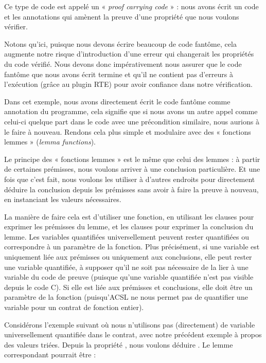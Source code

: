 



Ce type de code est appelé un « \textit{proof carrying code} » : nous avons écrit
un code et les annotations qui amènent la preuve d'une propriété que nous voulons
vérifier.


Notons qu'ici, puisque nous devons écrire beaucoup de code fantôme, cela augmente
notre risque d'introduction d'une erreur qui changerait les propriétés du code
vérifié. Nous devons donc impérativement nous assurer que le code fantôme que
nous avons écrit termine et qu'il ne contient pas d'erreurs à l'exécution
(grâce au plugin RTE) pour avoir confiance dans notre vérification.


Dans cet exemple, nous avons directement écrit le code fantôme comme annotation du
programme, cela signifie que si nous avons un autre appel comme celui-ci quelque
part dans le code avec une précondition similaire, nous aurions à le faire à
nouveau. Rendons cela plus simple et modulaire avec des « fonctions lemmes »
(\textit{lemma functions}).





Le principe des « fonctions lemmes » est le même que celui des lemmes : à
partir de certaines prémisses, nous voulons arriver à une conclusion particulière.
Et une fois que c'est fait, nous voulons les utiliser à d'autres endroits pour
directement déduire la conclusion depuis les prémisses sans avoir à faire la
preuve à nouveau, en instanciant les valeurs nécessaires.


La manière de faire cela est d'utiliser une fonction, en utilisant les clauses
 pour exprimer les prémisses du lemme, et les clauses
 pour exprimer la conclusion du lemme. Les variables
quantifiées universellement peuvent rester quantifiées ou correspondre à un
paramètre de la fonction. Plus précisément, si une variable est uniquement liée
aux prémisses ou uniquement aux conclusions, elle peut rester une variable
quantifiée, à supposer qu'il ne soit pas nécessaire de la lier à une variable
du code de preuve (puisque qu'une variable quantifiée n'est pas visible depuis
le code C). Si elle est liée aux prémisses et conclusions, elle doit être un
paramètre de la fonction (puisqu'ACSL ne nous permet pas de quantifier une
variable pour un contrat de fonction entier).


Considérons l'exemple suivant où nous n'utilisons pas (directement) de
variable universellement quantifiée dans le contrat, avec notre précédent
exemple à propos des valeurs triées. Depuis la propriété
, nous voulons déduire
. Le lemme correspondant pourrait être :


